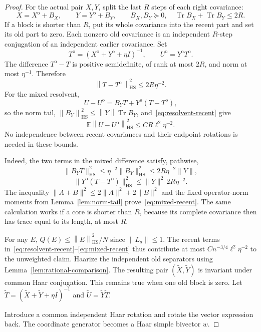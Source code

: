 \documentclass[11pt]{article}
\theoremstyle{definition}\newtheorem{definition}[theorem]{Definition}
\theoremstyle{remark}\newtheorem{remark}[theorem]{Remark}
\DeclareMathOperator{\Tr}{Tr}
\newcommand{\E}{\mathbb E}
\newcommand{\HS}{\mathrm{HS}}
\newcommand{\norm}[1]{\left\lVert#1\right\rVert}
\begin{document}
\begin{proof}
For the actual pair $X,Y$, split the last $R$ steps of each right covariance:
\[
 X=X^{\mathrm o}+B_X,\qquad Y=Y^{\mathrm o}+B_Y,
 \qquad B_X,B_Y\succeq0,\quad \Tr B_X+\Tr B_Y\le2R.
\]
If a block is shorter than $R$, put its whole covariance into the recent part and set its old part to zero. Each nonzero old covariance is an independent $R$-step conjugation of an independent earlier covariance. Set
\[
 T^{\mathrm o}=(X^{\mathrm o}+Y^{\mathrm o}+\eta I)^{-1},
 \qquad U^{\mathrm o}=Y^{\mathrm o}T^{\mathrm o}.
\]
The difference $T^{\mathrm o}-T$ is positive semidefinite, of rank at most $2R$, and norm at most $\eta^{-1}$. Therefore
\begin{equation}\label{eq:resolvent-recent}
 \norm{T-T^{\mathrm o}}_{\HS}^2\le2R\eta^{-2}.
\end{equation}
For the mixed resolvent,
\[
 U-U^{\mathrm o}=B_YT+Y^{\mathrm o}(T-T^{\mathrm o}),
\]
so the norm tail, $\norm{B_Y}_{\HS}^2\le\norm Y\Tr B_Y$, and~\eqref{eq:resolvent-recent} give
\begin{equation}\label{eq:mixed-recent}
 \E\norm{U-U^{\mathrm o}}_{\HS}^2
 \le C R\ell^2\eta^{-2}.
\end{equation}
No independence between recent covariances and their endpoint rotations is needed in these bounds.

Indeed, the two terms in the mixed difference satisfy, pathwise,
\[
 \|B_YT\|_{\HS}^2\le\eta^{-2}\|B_Y\|_{\HS}^2
 \le2R\eta^{-2}\|Y\|,
\]
\[
 \|Y^{\mathrm o}(T-T^{\mathrm o})\|_{\HS}^2
 \le\|Y\|^2\,2R\eta^{-2}.
\]
The inequality $\|A+B\|^2\le2\|A\|^2+2\|B\|^2$ and the fixed operator-norm moments from Lemma~\ref{lem:norm-tail} prove~\eqref{eq:mixed-recent}. The same calculation works if a core is shorter than $R$, because its complete covariance then has trace equal to its length, at most $R$.


For any $E$, $Q(E)\le\norm E_{\HS}^2/N$ since $\norm{L_a}\le1$. The recent terms in~\eqref{eq:resolvent-recent}--\eqref{eq:mixed-recent} thus contribute at most
$C n^{-3/4}\ell^2\eta^{-2}$ to the unweighted claim. Haarize the independent old separators using Lemma~\ref{lem:rational-comparison}. The resulting pair $(\widetilde X,\widetilde Y)$ is invariant under common Haar conjugation. This remains true when one old block is zero. Let $\widetilde T=(\widetilde X+\widetilde Y+\eta I)^{-1}$ and $\widetilde U=\widetilde Y\widetilde T$.

Introduce a common independent Haar rotation and rotate the vector expression back. The coordinate generator becomes a Haar simple bivector $w$.


\end{proof}
\end{document}
